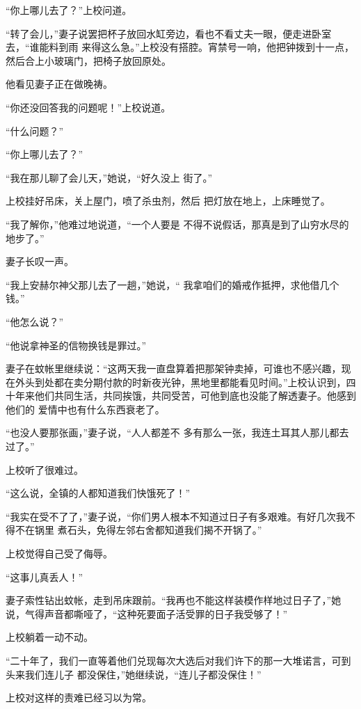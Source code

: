 \documentclass{article}
\begin{document}
“你上哪儿去了？”上校问道。 

“转了会儿，”妻子说罢把杯子放回水缸旁边，看也不看丈夫一眼，便走进卧室去，“谁能料到雨
\newpage
来得这么急。”上校没有搭腔。宵禁号一响，他把钟拨到十一点，然后合上小玻璃门，把椅子放回原处。


他看见妻子正在做晚祷。 


“你还没回答我的问题呢！”上校说道。 


“什么问题？” 


“你上哪儿去了？” 

“我在那儿聊了会儿天，”她说，“好久没上
街了。” 

上校挂好吊床，关上屋门，喷了杀虫剂，然后
把灯放在地上，上床睡觉了。 

“我了解你，”他难过地说道，“一个人要是
不得不说假话，那真是到了山穷水尽的地步了。” 


\newpage

妻子长叹一声。 

“我上安赫尔神父那儿去了一趟，”她说，“
我拿咱们的婚戒作抵押，求他借几个钱。” 


“他怎么说？” 


“他说拿神圣的信物换钱是罪过。” 

妻子在蚊帐里继续说：“这两天我一直盘算着把那架钟卖掉，可谁也不感兴趣，现在外头到处都在卖分期付款的时新夜光钟，黑地里都能看见时间。”上校认识到，四十年来他们共同生活，共同挨饿，共同受苦，可他到底也没能了解透妻子。他感到他们的
爱情中也有什么东西衰老了。 

“也没人要那张画，”妻子说，“人人都差不
多有那么一张，我连土耳其人那儿都去过了。” 


上校听了很难过。 

“这么说，全镇的人都知道我们快饿死了！”
\newpage


“我实在受不了了，”妻子说，“你们男人根本不知道过日子有多艰难。有好几次我不得不在锅里
煮石头，免得左邻右舍都知道我们揭不开锅了。” 


上校觉得自己受了侮辱。 


“这事儿真丢人！” 

妻子索性钻出蚊帐，走到吊床跟前。“我再也不能这样装模作样地过日子了，”她说，气得声音都嘶哑了，“这种死要面子活受罪的日子我受够了！”


上校躺着一动不动。 

“二十年了，我们一直等着他们兑现每次大选后对我们许下的那一大堆诺言，可到头来我们连儿子
都没保住，”她继续说，“连儿子都没保住！” 


上校对这样的责难已经习以为常。 

\newpage
\end{document}
